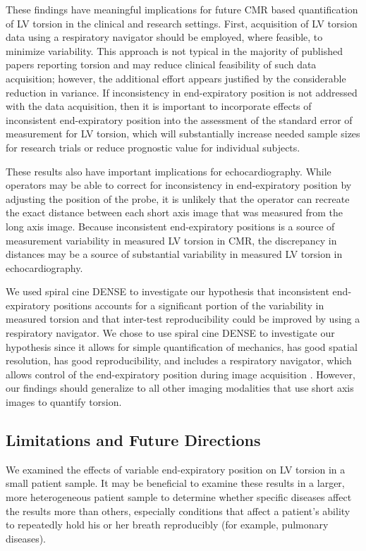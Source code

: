 	These findings have meaningful implications for future CMR based quantification of LV torsion in the clinical and research settings. First, acquisition of LV torsion data using a respiratory navigator should be employed, where feasible, to minimize variability. This approach is not typical in the majority of published papers reporting torsion and may reduce clinical feasibility of such data acquisition; however, the additional effort appears justified by the considerable reduction in variance. If inconsistency in end-expiratory position is not addressed with the data acquisition, then it is important to incorporate effects of inconsistent end-expiratory position into the assessment of the standard error of measurement for LV torsion, which will substantially increase needed sample sizes for research trials or reduce prognostic value for individual subjects.
	
	These results also have important implications for echocardiography. While operators may be able to correct for inconsistency in end-expiratory position by adjusting the position of the probe, it is unlikely that the operator can recreate the exact distance between each short axis image that was measured from the long axis image. Because inconsistent end-expiratory positions is a source of measurement variability in measured LV torsion in CMR, the discrepancy in distances may be a source of substantial variability in measured LV torsion in echocardiography.
	
	We used spiral cine DENSE to investigate our hypothesis that inconsistent end-expiratory positions accounts for a significant portion of the variability in measured torsion and that inter-test reproducibility could be improved by using a respiratory navigator. We chose to use spiral cine DENSE to investigate our hypothesis since it allows for simple quantification of mechanics, has good spatial resolution, has good reproducibility, and includes a respiratory navigator, which allows control of the end-expiratory position during image acquisition \cite{Zhong2010,Haggerty2013,Aletras1999,Aletras1999a}. However, our findings should generalize to all other imaging modalities that use short axis images to quantify torsion.

\subsection{Limitations and Future Directions}
	We examined the effects of variable end-expiratory position on LV torsion in a small patient sample. It may be beneficial to examine these results in a larger, more heterogeneous patient sample to determine whether specific diseases affect the results more than others, especially conditions that affect a patient's ability to repeatedly hold his or her breath reproducibly (for example, pulmonary diseases).
	
